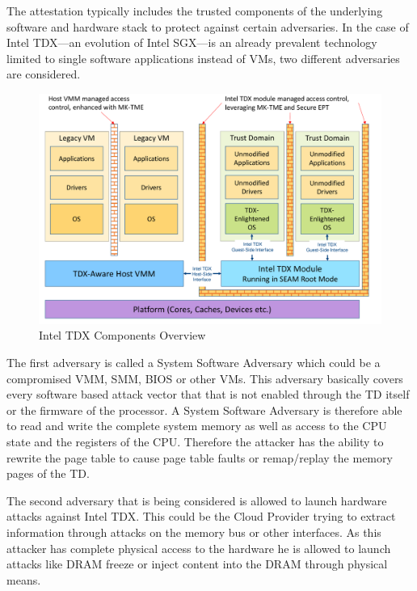 \documentclass[sigplan,screen,nonacm]{acmart}
\begin{document}
The attestation typically includes the trusted components of the underlying software and hardware stack to protect against certain adversaries.
In the case of Intel TDX---an evolution of Intel SGX---is an already prevalent technology limited to single software applications instead of VMs, two different adversaries are considered.
\begin{figure}
  \centering
  \includegraphics[width=\linewidth]{pictures/TDX_Arch.png}
  \caption{Intel TDX Components Overview \cite{Intel-TDX-Module-Specs}}
  \label{fig:tdxcomponents}
\end{figure}

The first adversary is called a System Software Adversary which could be a compromised VMM, SMM, BIOS or other VMs.
This adversary basically covers every software based attack vector that that is not enabled through the TD itself or the firmware of the processor\cite[p. 8]{Intel-TDX-Whitepaper}.
A System Software Adversary is therefore able to read and write the complete system memory as well as access to the CPU state and the registers of the CPU.
Therefore the attacker has the ability to rewrite the page table to cause page table faults or remap/replay the memory pages of the TD.

The second adversary that is being considered is allowed to launch hardware attacks against Intel TDX.
This could be the Cloud Provider trying to extract information through attacks on the memory bus or other interfaces.
As this attacker has complete physical access to the hardware he is allowed to launch attacks like DRAM freeze or inject content into the DRAM through physical means\cite[p. 8]{Intel-TDX-Whitepaper}.
\end{document}
